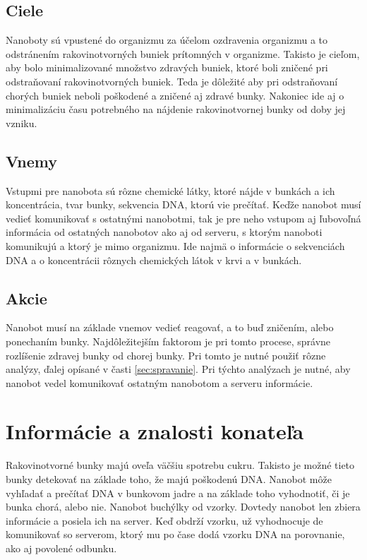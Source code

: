\documentclass[10pt,twoside,slovak,a4paper]{article}
\begin{document}
\subsection{Ciele}
Nanoboty sú vpustené do organizmu za účelom ozdravenia organizmu a to odstránením rakovinotvorných buniek prítomných v organizme. Takisto je cieľom, aby bolo minimalizované množstvo zdravých buniek, ktoré boli zničené pri odstraňovaní rakovinotvorných buniek. Teda je dôležité aby pri odstraňovaní chorých buniek neboli poškodené a zničené aj zdravé bunky. Nakoniec ide aj o minimalizáciu času potrebného na nájdenie rakovinotvornej bunky od doby jej vzniku.

\subsection{Vnemy}
Vstupmi pre nanobota sú rôzne chemické látky, ktoré nájde v bunkách a ich koncentrácia, tvar bunky, sekvencia DNA, ktorú vie prečítať. Keďže nanobot musí vedieť komunikovať s ostatnými nanobotmi, tak je pre neho vstupom aj ľubovoľná informácia od ostatných nanobotov ako aj od serveru, s ktorým nanoboti komunikujú a ktorý je mimo organizmu. Ide najmä o informácie o sekvenciách DNA a o koncentrácii rôznych chemických látok v krvi a v bunkách.

\subsection{Akcie}
Nanobot musí na základe vnemov vedieť reagovať, a to buď zničením, alebo ponechaním bunky. Najdôležitejším faktorom je pri tomto procese, správne rozlíšenie zdravej bunky od chorej bunky. Pri tomto je nutné použiť rôzne analýzy, ďalej opísané v časti \ref{sec:spravanie}. Pri týchto analýzach je nutné, aby nanobot vedel komunikovať ostatným nanobotom a serveru informácie.


\section{Informácie a znalosti konateľa}
\label{sec:znalosti}
Rakovinotvorné bunky majú oveľa väčšiu spotrebu cukru. Takisto je možné tieto bunky detekovať na základe toho, že majú poškodenú DNA. Nanobot môže vyhľadať a prečítať DNA v bunkovom jadre a na základe toho vyhodnotiť, či je bunka chorá, alebo nie.
\cite{Wikipedia-nador,cancer-cell-metabolism}
Nanobot buchýlky od vzorky. Dovtedy nanobot len zbiera informácie a posiela ich na server. Keď obdrží vzorku, už vyhodnocuje de komunikovať so serverom, ktorý mu po čase dodá vzorku DNA na porovnanie, ako aj povolené odbunku.
\end{document}
